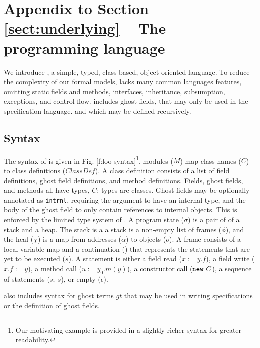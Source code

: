 \section{Appendix to Section \ref{sect:underlying} -- The programming language \LangOO}
\label{app:loo}


We introduce \LangOO, a simple, typed, class-based, object-oriented language.
To reduce the complexity of our formal models, \LangOO lacks many
common languages features, omitting static fields and methods, interfaces,
inheritance, subsumption, exceptions, and control flow.  
 \LangOO includes ghost fields,  that may only be used in the specification language.
and which may be defined recursively.


\subsection{Syntax}

The syntax of \LangOO is given in Fig. \ref{f:loo-syntax}\footnote{{Our motivating example is provided in a slightly richer syntax for greater readability.}}.
\LangOO modules ($M$) map class names ($C$) to class definitions ($\textit{ClassDef}$).
A class definition consists of %
a list of field definitions, ghost field definitions, and method definitions.
{Fields, ghost fields, and methods all have types, $C$; {types are
    classes}.
    Ghost fields may be optionally 
 annotated as \texttt{intrnl}, requiring the argument to have an internal type, and the 
body of the ghost field to only contain references to internal objects. This is enforced by the
limited type system of \LangOO.}
A program state ($\sigma$) is a pair of of a stack and a heap.
The stack is a a stack is a non-empty list of frames ($\phi$), and the heal ($\chi$)
is a map from addresses ($\alpha$) to objects ($o$). A frame consists of a local variable
map and a continuation () that represents the statements that are yet to be executed ($s$).
A statement is either a field read ($x := y.f$), a field write ($x.f := y$), a method call
($u :=y_0.m(\overline{y})$), a constructor call ($\mbox{\normalfont{\texttt{new}}}\ C$), 
  a sequence of statements ($s;\ s$),
  or empty ($\epsilon$).


\LangOO also includes syntax for ghost terms $gt$ that may %
be used in writing
specifications or the definition of ghost fields.


